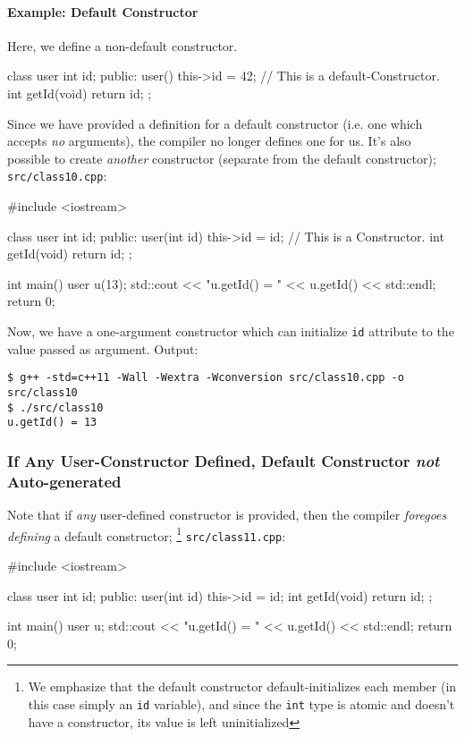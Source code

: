 \documentclass[12pt,letterpaper,twoside]{article}
\begin{document}
\paragraph{Example: Default Constructor}
Here, we define a non-default constructor.
\begin{cpp}
class user {
  int id;
 public:
  user() { this->id = 42; }   // This is a default-Constructor.
  int getId(void) { return id; }
};
\end{cpp}
Since we have provided a definition for a default constructor (i.e. one which
accepts \emph{no} arguments), the compiler no longer defines one for us.
It's also possible to create \emph{another} constructor 
(separate from the default constructor);
\texttt{src/class10.cpp}:

\begin{cpp}
#include <iostream>

class user {
  int id;
 public:
  user(int id) { this->id = id; }   // This is a Constructor.
  int getId(void) { return id; }
};

int main() {
  user u(13);
  std::cout << "u.getId() = " << u.getId() << std::endl;
  return 0;
}
\end{cpp}

Now, we have a one-argument constructor which can initialize \texttt{id} 
attribute to the value passed as argument.
Output:

\begin{verbatim}
$ g++ -std=c++11 -Wall -Wextra -Wconversion src/class10.cpp -o src/class10
$ ./src/class10
u.getId() = 13
\end{verbatim}

\subsubsection{If Any User-Constructor Defined, Default Constructor \emph{not} Auto-generated}
Note that if \emph{any} user-defined constructor is provided, then the compiler \emph{foregoes defining} a default constructor; \footnote{We emphasize that 
the default constructor default-initializes each 
member (in this case simply an \texttt{id} variable), and since the 
\texttt{int} type is atomic and doesn't have a constructor, its value is 
left uninitialized}
\texttt{src/class11.cpp}:

\begin{cpp}
#include <iostream>

class user {
  int id;
 public:
  user(int id) { this->id = id; }
  int getId(void) { return id; }
};

int main() {
  user u;
  std::cout << "u.getId() = " << u.getId() << std::endl;
  return 0;
}
\end{cpp}
\end{document}
